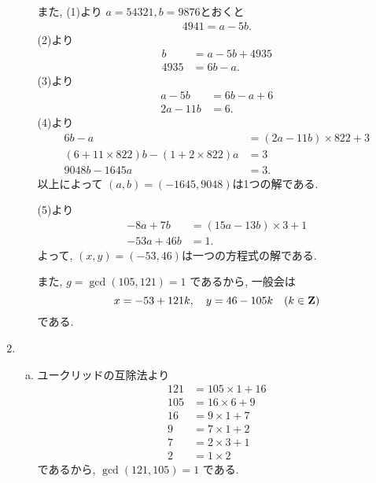 \begin{enumerate}[6.1]
\begin{enumerate}[(a)]
  また, (1)より $a = 54321, b=9876$とおくと
  \begin{align*}
    4941 = a - 5b.
  \end{align*}
  (2)より
  \begin{align*}
    b &= a - 5b + 4935 \\
    4935 &= 6b - a.
  \end{align*}
  (3)より
  \begin{align*}
    a - 5b &= 6b - a + 6 \\
    2a - 11b &= 6.
  \end{align*}
  (4)より
  \begin{align*}
    6b - a &= (2a - 11b) \times 822 + 3 \\
    (6 + 11 \times 822)b - (1 + 2 \times 822)a &= 3 \\
    9048b - 1645a &= 3.
  \end{align*}
  以上によって $(a, b) = (-1645, 9048)$は1つの解である.

  (5)より
  \begin{align*}
    -8a + 7b &= (15a - 13b) \times 3 + 1 \\
    -53a + 46b &= 1.
  \end{align*}
  よって, $(x, y) = (-53, 46)$は一つの方程式の解である.

  また, $g = \gcd(105, 121) = 1$ であるから, 一般会は
  \[
    x = -53 + 121k, \quad
    y =  46 - 105k \quad (k \in \mathbf{Z})
  \]
  である.
  \end{enumerate}
  \item
  \begin{enumerate}[(a)]
    \item
    ユークリッドの互除法より
    \begin{align}
      121 &= 105 \times 1 + 16 \tag{1} \\
      105 &=  16 \times 6 + 9  \tag{2} \\
      16  &=   9 \times 1 + 7  \tag{3} \\
      9   &=   7 \times 1 + 2  \tag{4} \\
      7   &=   2 \times 3 + 1  \tag{5} \\
      2   &=   1 \times 2      \tag{6}
    \end{align}
    であるから, $\gcd(121, 105) = 1$ である.


\end{enumerate}
\end{enumerate}
